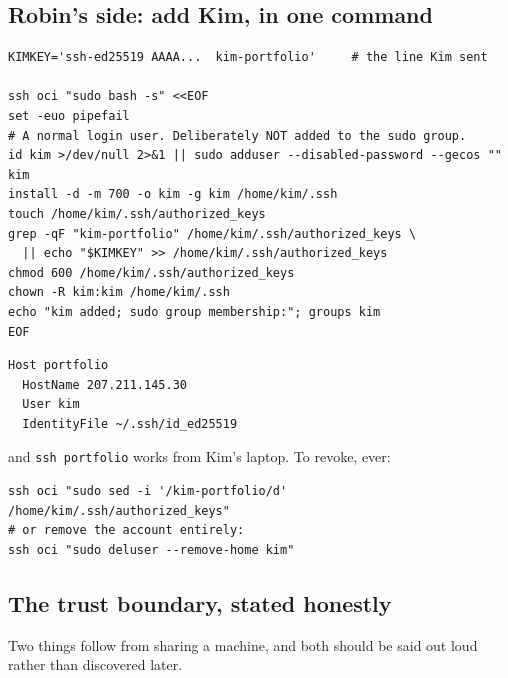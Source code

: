 \documentclass[11pt,a4paper]{article}
\begin{document}
\subsection{Robin's side: add Kim, in one command}

\begin{codebox}
\begin{lstlisting}[style=shell]
KIMKEY='ssh-ed25519 AAAA...  kim-portfolio'     # the line Kim sent

ssh oci "sudo bash -s" <<EOF
set -euo pipefail
# A normal login user. Deliberately NOT added to the sudo group.
id kim >/dev/null 2>&1 || sudo adduser --disabled-password --gecos "" kim
install -d -m 700 -o kim -g kim /home/kim/.ssh
touch /home/kim/.ssh/authorized_keys
grep -qF "kim-portfolio" /home/kim/.ssh/authorized_keys \
  || echo "$KIMKEY" >> /home/kim/.ssh/authorized_keys
chmod 600 /home/kim/.ssh/authorized_keys
chown -R kim:kim /home/kim/.ssh
echo "kim added; sudo group membership:"; groups kim
EOF
\end{lstlisting}
\end{codebox}

\begin{codebox}
\begin{lstlisting}[style=shell]
Host portfolio
  HostName 207.211.145.30
  User kim
  IdentityFile ~/.ssh/id_ed25519
\end{lstlisting}
\end{codebox}

\noindent
and \texttt{ssh portfolio} works from Kim's laptop. To revoke, ever:

\begin{codebox}[Revocation]
\begin{lstlisting}[style=shell]
ssh oci "sudo sed -i '/kim-portfolio/d' /home/kim/.ssh/authorized_keys"
# or remove the account entirely:
ssh oci "sudo deluser --remove-home kim"
\end{lstlisting}
\end{codebox}

\subsection{The trust boundary, stated honestly}

Two things follow from sharing a machine, and both should be said out
loud rather than discovered later.
\end{document}
